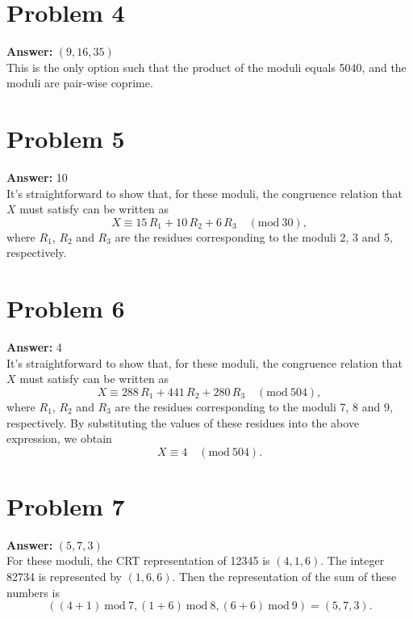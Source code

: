 \documentclass[11pt]{article}
\newcommand{\Mod}{\mathrm{mod}\:}
\begin{document}
\section*{Problem 4}
\label{sec:orgfbd5603}
\textbf{Answer:} \((9,16,35)\)\\

This is the only option such that the product of the moduli equals 5040, and the
moduli are pair-wise coprime.
\section*{Problem 5}
\label{sec:org090a20b}
\textbf{Answer:} 10\\

It's straightforward to show that, for these moduli, the congruence relation
that \(X\) must satisfy can be written as
\begin{equation}
X\equiv 15\,R_1+10\,R_2+6\,R_3\quad(\Mod 30),
\end{equation}
where \(R_1\), \(R_2\) and \(R_3\) are the residues corresponding to the
moduli 2, 3 and 5, respectively.
\section*{Problem 6}
\label{sec:orgdac7e26}
\textbf{Answer:} 4\\

It's straightforward to show that, for these moduli, the congruence relation
that \(X\) must satisfy can be written as
\begin{equation}
X\equiv 288\,R_1+441\,R_2+280\,R_3\quad(\Mod 504),
\end{equation}
where \(R_1\), \(R_2\) and \(R_3\) are the residues corresponding to the
moduli 7, 8 and 9, respectively. By substituting the values of these residues
into the above expression, we obtain
\begin{equation}
X\equiv 4\quad(\Mod 504).
\end{equation}
\section*{Problem 7}
\label{sec:orgea05915}
\textbf{Answer:} \((5,7,3)\)\\

For these moduli, the CRT representation of 12345 is \((4,1,6)\). The integer
82734 is represented by \((1,6,6)\). Then the representation of the sum of
these numbers is
\begin{equation}
((4+1)\:\Mod 7,(1+6)\:\Mod 8,(6+6)\:\Mod 9)=(5,7,3).
\end{equation}
\end{document}
